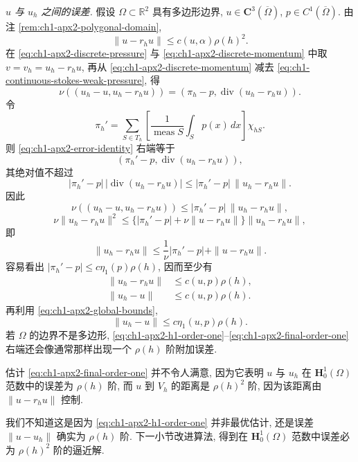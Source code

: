 \emph{$u$ 与 $u_h$ 之间的误差.} 假设 $\Omega\subset\mathbb R^2$ 具有多边形边界, $u\in\mathbf C^3(\overline\Omega)$, $p\in C^1(\overline\Omega)$. 由注 \ref{rem:ch1-apx2-polygonal-domain},
\begin{equation}
\|u-r_hu\|\leq c(u,\alpha)\rho(h)^2.
\label{eq:ch1-apx2-restriction-h1-error}
\end{equation}
在 \eqref{eq:ch1-apx2-discrete-pressure} 与 \eqref{eq:ch1-apx2-discrete-momentum} 中取 $v=v_h=u_h-r_hu$, 再从 \eqref{eq:ch1-apx2-discrete-momentum} 减去 \eqref{eq:ch1-continuous-stokes-weak-pressure}, 得
\begin{equation}
\nu((u_h-u,u_h-r_hu))
=(\pi_h-p,\operatorname{div}(u_h-r_hu)).
\label{eq:ch1-apx2-error-identity}
\end{equation}
令
\begin{equation}
\pi_h'
=\sum_{S\in T_h}
\left[\frac1{\operatorname{meas}S}\int_Sp(x)\,dx\right]\chi_{hS}.
\label{eq:ch1-apx2-cell-average-pressure}
\end{equation}
则 \eqref{eq:ch1-apx2-error-identity} 右端等于
\[
(\pi_h'-p,\operatorname{div}(u_h-r_hu)),
\]
其绝对值不超过
\[
|\pi_h'-p|\,|\operatorname{div}(u_h-r_hu)|
\leq|\pi_h'-p|\,\|u_h-r_hu\|.
\]
因此
\[
\nu((u_h-u,u_h-r_hu))
\leq|\pi_h'-p|\,\|u_h-r_hu\|,
\]
\[
\nu\|u_h-r_hu\|^2
\leq\{|\pi_h'-p|+\nu\|u-r_hu\|\}\|u_h-r_hu\|,
\]
即
\begin{equation}
\|u_h-r_hu\|
\leq\frac1\nu|\pi_h'-p|+\|u-r_hu\|.
\label{eq:ch1-apx2-error-basic-bound}
\end{equation}
容易看出 $|\pi_h'-p|\leq c\eta_1(p)\rho(h)$, 因而至少有
\begin{equation}
\begin{aligned}
\|u_h-r_hu\|&\leq c(u,p)\rho(h),\\
\|u_h-u\|&\leq c(u,p)\rho(h).
\end{aligned}
\label{eq:ch1-apx2-h1-order-one}
\end{equation}
再利用 \eqref{eq:ch1-apx2-global-bounds},
\begin{equation}
\|u_h-u\|\leq c\eta_1(u,p)\rho(h).
\label{eq:ch1-apx2-final-order-one}
\end{equation}
若 $\Omega$ 的边界不是多边形, \eqref{eq:ch1-apx2-h1-order-one}--\eqref{eq:ch1-apx2-final-order-one} 右端还会像通常那样出现一个 $\rho(h)$ 阶附加误差.

\begin{Remark}
\label{rem:ch1-apx2-suboptimal-error}
估计 \eqref{eq:ch1-apx2-final-order-one} 并不令人满意, 因为它表明 $u$ 与 $u_h$ 在 $\mathbf H_0^1(\Omega)$ 范数中的误差为 $\rho(h)$ 阶, 而 $u$ 到 $V_h$ 的距离是 $\rho(h)^2$ 阶, 因为该距离由 $\|u-r_hu\|$ 控制.

我们不知道这是因为 \eqref{eq:ch1-apx2-h1-order-one} 并非最优估计, 还是误差 $\|u-u_h\|$ 确实为 $\rho(h)$ 阶. 下一小节改进算法, 得到在 $\mathbf H_0^1(\Omega)$ 范数中误差必为 $\rho(h)^2$ 阶的逼近解.
\end{Remark}

